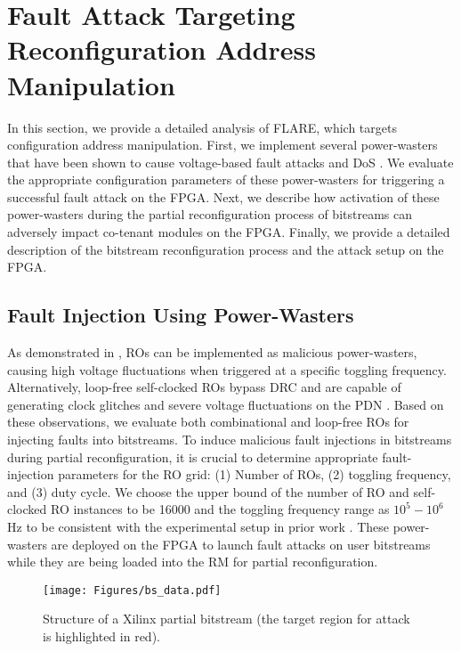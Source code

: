\section{Fault Attack Targeting Reconfiguration Address Manipulation}
\vspace{-0.1cm}
In this section, we provide a detailed analysis of FLARE, which targets configuration address manipulation. First, we implement several power-wasters that have been shown to cause voltage-based fault attacks and DoS \cite{8056840, FPGAhammer, Krautter2019MitigatingCloud, 9810438}. We evaluate the appropriate configuration parameters of these power-wasters for triggering a successful fault attack on the FPGA. Next, we describe how activation of these power-wasters during the partial reconfiguration process of bitstreams can adversely impact co-tenant modules on the FPGA. Finally, we provide a detailed description of the bitstream reconfiguration process and the attack setup on the FPGA.
\vspace{-0.1cm}
 \subsection{Fault Injection Using Power-Wasters }
\vspace{-0.1cm}
 As demonstrated in \cite{8056840, chaudhuri2024hackingfabrictargetingpartial}, ROs can be implemented as malicious power-wasters, causing high voltage fluctuations when triggered at a specific toggling frequency. Alternatively, loop-free self-clocked ROs  bypass DRC and are capable of generating clock glitches and severe voltage fluctuations on the PDN \cite{Sugawara2019OscillatorCentre}. Based on these observations, we evaluate both combinational and loop-free ROs for injecting faults into bitstreams. To induce malicious fault injections in bitstreams during partial reconfiguration, it is crucial to determine appropriate fault-injection parameters for the RO grid: (1) Number of ROs, (2) toggling frequency, and (3) duty cycle. We choose the upper bound of the number of RO and self-clocked RO instances to be 16000 and the toggling frequency range as $10^5-10^6$ Hz to be consistent with the experimental setup in prior work \cite{chaudhuri2024hackingfabrictargetingpartial, gnad2020remote}. These power-wasters are deployed on the FPGA to launch fault attacks on user bitstreams while they are being loaded into the RM for partial reconfiguration.
\vspace{-0.1cm}
\begin{figure}
\centering
\texttt{[image: Figures/bs\_data.pdf]}

\caption{Structure of a Xilinx partial bitstream (the target region for attack is highlighted in red).}
\label{structure}
\vspace{-0.5cm}
\end{figure}
